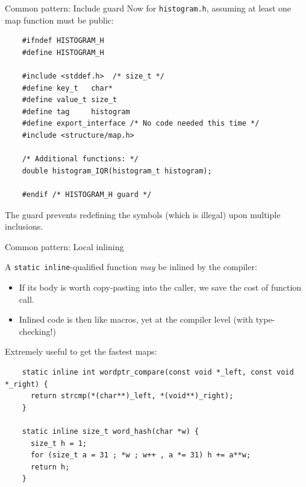 \begin{frame}[fragile]{Common pattern: Include guard}
  Now for \lstinline{histogram.h}, assuming at least one map function must be public:
  \begin{lstlisting}
    #ifndef HISTOGRAM_H
    #define HISTOGRAM_H

    #include <stddef.h>  /* size_t */
    #define key_t   char*
    #define value_t size_t
    #define tag     histogram
    #define export_interface /* No code needed this time */
    #include <structure/map.h>

    /* Additional functions: */
    double histogram_IQR(histogram_t histogram);
    
    #endif /* HISTOGRAM_H guard */
  \end{lstlisting}

  The guard prevents redefining the symbols (which is illegal) upon multiple inclusions.

\end{frame}

\begin{frame}[fragile]{Common pattern: Local inlining}

  A \lstinline{static inline}-qualified function {\em may} be inlined by the compiler:

  \begin{itemize}
  \item If its body is worth copy-pasting into the caller, we save the cost of function call.
  \item Inlined code is then like macros, yet at the compiler level (with type-checking!)
  \end{itemize}

  Extremely useful to get the fastest maps:

  \begin{lstlisting}
    static inline int wordptr_compare(const void *_left, const void *_right) {
      return strcmp(*(char**)_left, *(void**)_right);
    }
    
    static inline size_t word_hash(char *w) {
      size_t h = 1;
      for (size_t a = 31 ; *w ; w++ , a *= 31) h += a**w;
      return h;
    }
  \end{lstlisting}
  
\end{frame}

